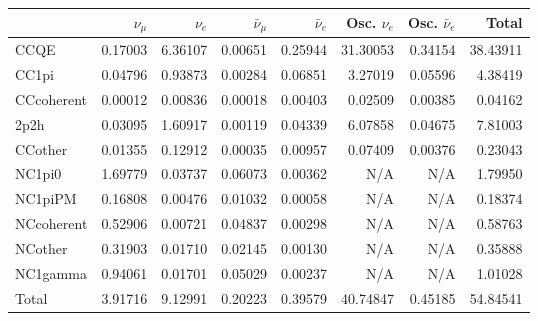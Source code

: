\begin{tabular} { | l ||r | r | r | r | r | r | | r | }
\hline
              & $\nu_\mu$            & $\nu_e$              & $\bar{\nu}_{\mu}$    & $\bar{\nu}_{e}$      & Osc. $\nu_e$         & Osc. $\bar{\nu}_{e}$ & Total                \\ \hline\hline
 CCQE         & 0.17003              & 6.36107              & 0.00651              & 0.25944              & 31.30053             & 0.34154              & 38.43911             \\ \hline
 CC1pi        & 0.04796              & 0.93873              & 0.00284              & 0.06851              & 3.27019              & 0.05596              & 4.38419              \\ \hline
 CCcoherent   & 0.00012              & 0.00836              & 0.00018              & 0.00403              & 0.02509              & 0.00385              & 0.04162              \\ \hline
 2p2h         & 0.03095              & 1.60917              & 0.00119              & 0.04339              & 6.07858              & 0.04675              & 7.81003              \\ \hline
 CCother      & 0.01355              & 0.12912              & 0.00035              & 0.00957              & 0.07409              & 0.00376              & 0.23043              \\ \hline
 NC1pi0       & 1.69779              & 0.03737              & 0.06073              & 0.00362              & N/A                  & N/A                  & 1.79950              \\ \hline
 NC1piPM      & 0.16808              & 0.00476              & 0.01032              & 0.00058              & N/A                  & N/A                  & 0.18374              \\ \hline
 NCcoherent   & 0.52906              & 0.00721              & 0.04837              & 0.00298              & N/A                  & N/A                  & 0.58763              \\ \hline
 NCother      & 0.31903              & 0.01710              & 0.02145              & 0.00130              & N/A                  & N/A                  & 0.35888              \\ \hline
 NC1gamma     & 0.94061              & 0.01701              & 0.05029              & 0.00237              & N/A                  & N/A                  & 1.01028              \\ \hline
\hline
 Total        & 3.91716              & 9.12991              & 0.20223              & 0.39579              & 40.74847             & 0.45185              & 54.84541             \\ \hline

\end{tabular}
